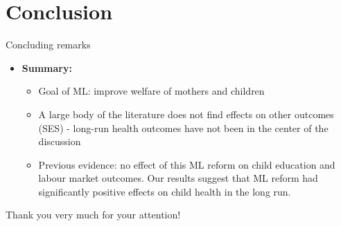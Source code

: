 \documentclass[handout]{beamer} %
\begin{document}
\section{Conclusion}
\begin{frame}{Concluding remarks}
\begin{itemize}
\item \textbf{Summary:}
\begin{itemize}
\item Goal of ML: improve welfare of mothers and children
\item A large body of the literature does not find effects on other outcomes (SES) - long-run health outcomes have not been in the center of the discussion

\item Previous evidence: no effect of this ML reform on child education and labour market outcomes.
Our results suggest that ML reform had significantly positive effects on child health in the long run.


\end{itemize}
\end{itemize}



\end{frame}




\begin{frame}
\begin{center}
Thank you very much for your attention!
\end{center}




\end{frame}
\end{document}
